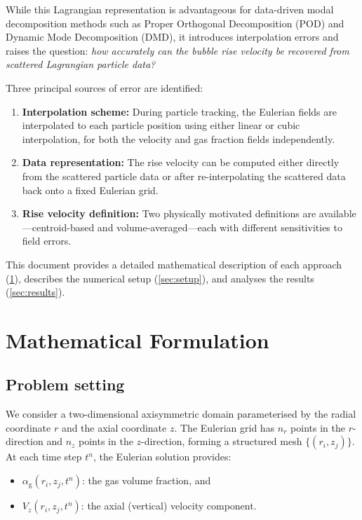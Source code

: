 \documentclass[11pt,a4paper]{article}
\newcommand{\alphag}{\alpha_{\mathrm{g}}}
\newcommand{\Vz}{V_z}
\begin{document}
While this Lagrangian representation is advantageous for data-driven modal
decomposition methods such as Proper Orthogonal Decomposition (POD) and
Dynamic Mode Decomposition (DMD), it introduces interpolation errors and
raises the question: \emph{how accurately can the bubble rise velocity be
recovered from scattered Lagrangian particle data?}

Three principal sources of error are identified:
\begin{enumerate}[label=(\roman*)]
  \item \textbf{Interpolation scheme:} During particle tracking, the
        Eulerian fields are interpolated to each particle position using
        either linear or cubic interpolation, for both the velocity and gas
        fraction fields independently.
  \item \textbf{Data representation:} The rise velocity can be computed
        either directly from the scattered particle data or after
        re-interpolating the scattered data back onto a fixed Eulerian grid.
  \item \textbf{Rise velocity definition:} Two physically motivated
        definitions are available---centroid-based and volume-averaged---each
        with different sensitivities to field errors.
\end{enumerate}

This document provides a detailed mathematical description of each
approach (\cref{sec:formulation}), describes the numerical setup
(\cref{sec:setup}), and analyses the results (\cref{sec:results}).


\section{Mathematical Formulation}\label{sec:formulation}

\subsection{Problem setting}

We consider a two-dimensional axisymmetric domain parameterised by the
radial coordinate $r$ and the axial coordinate $z$.  The Eulerian grid has
$n_r$ points in the $r$-direction and $n_z$ points in the $z$-direction,
forming a structured mesh $\{(r_i, z_j)\}$.  At each time step $t^n$, the
Eulerian solution provides:
\begin{itemize}
  \item $\alphag(r_i,z_j,t^n)$: the gas volume fraction, and
  \item $\Vz(r_i,z_j,t^n)$: the axial (vertical) velocity component.
\end{itemize}
\end{document}
